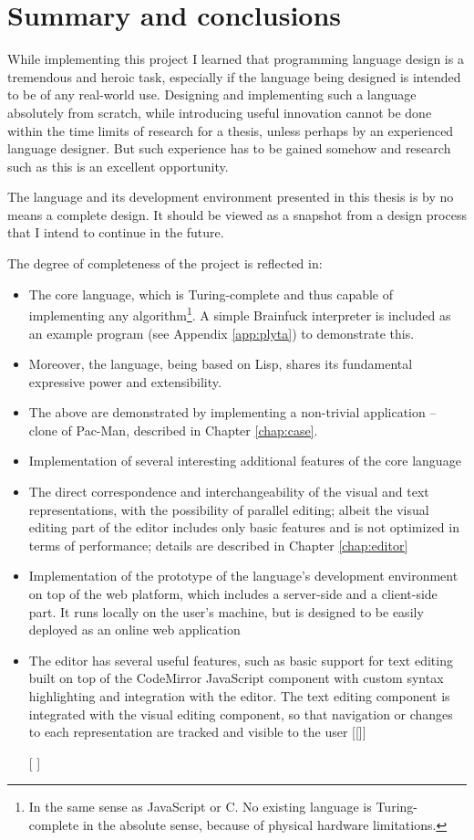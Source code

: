 \chapter{Summary and conclusions}\label{chap:summary}
While implementing this project I learned that programming language design is a
tremendous and heroic task, especially if the language being designed is intended to be of any real-world use. Designing and implementing such a language absolutely from scratch, while introducing useful innovation cannot be done within the time limits of research for a thesis, unless perhaps by an experienced language designer. But such experience has to be gained somehow and research such as this is an excellent opportunity.

The language and its development environment presented in this thesis is by no means a complete design. It should be viewed as a snapshot from a design process that I intend to continue in the future.

The degree of completeness of the project is reflected in:
\begin{itemize}
    \item The core language, which is Turing-complete and thus capable of implementing any algorithm\footnote{In the same sense as JavaScript or C. No existing language is Turing-complete in the absolute sense, because of physical hardware limitations.}. A simple Brainfuck interpreter is included as an example program (see Appendix \ref{app:plyta}) to demonstrate this\cite{bf_turing_complete}.
    \item Moreover, the language, being based on Lisp, shares its fundamental expressive power and extensibility.
    \item The above are demonstrated by implementing a non-trivial application -- clone of Pac-Man, described in Chapter \ref{chap:case}.
    \item Implementation of several interesting additional features of the core
    language 
    \item The direct correspondence and interchangeability of the visual and text representations, with the possibility of parallel editing; albeit the visual editing part of the editor includes only basic features and is not optimized in terms of performance; details are described in Chapter \ref{chap:editor}
    \item Implementation of the prototype of the language's development
    environment on top of the web platform, which includes a server-side and a
    client-side part. It runs locally on the user's machine, but is designed
    to be easily deployed as an online web application
    \item The editor has several useful features, such as basic support for text
    editing built on top of the CodeMirror JavaScript component with custom
    syntax highlighting and integration with the editor. The text editing
    component is integrated with the visual editing component, so that
    navigation or changes to each representation are tracked and visible to
    the user [[]]
    \item [[]]
\end{itemize}

